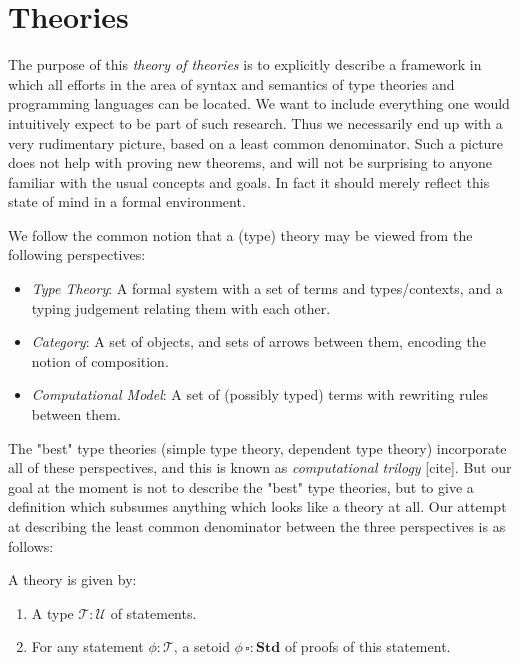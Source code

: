 \documentclass[11pt]{article}
\date{\today}
\title{}
\begin{document}
\tableofcontents

\section{Theories}
\label{sec:org2132292}

The purpose of this \emph{theory of theories} is to explicitly describe a framework in
which all efforts in the area of syntax and semantics of type theories and programming languages
can be located. We want to include everything one would intuitively expect to be part of such research.
Thus we necessarily end up with a very rudimentary picture, based on a least common denominator.
Such a picture does not help with proving new theorems, and will not be surprising to anyone familiar
with the usual concepts and goals. In fact it should merely reflect this state of mind in a formal environment.

We follow the common notion that a (type) theory may be viewed from the following perspectives:
\begin{itemize}
\item \emph{Type Theory}: A formal system with a set of terms and types/contexts, and a typing judgement relating them with each other.
\item \emph{Category}: A set of objects, and sets of arrows between them, encoding the notion of composition.
\item \emph{Computational Model}: A set of (possibly typed) terms with rewriting rules between them.
\end{itemize}

The "best" type theories (simple type theory, dependent type theory) incorporate all of these perspectives,
and this is known as \emph{computational trilogy} [cite]. But our goal at the moment is not to describe the "best" type theories,
but to give a definition which subsumes anything which looks like a theory at all. Our attempt at describing the least common denominator
between the three perspectives is as follows:

\begin{definition}
  A theory is given by:
  \begin{enumerate}
    \item A type $\mathscr{T} : \mathscr{U}$ of statements.
    \item For any statement $\phi : \mathscr{T}$, a setoid $\phi\,\square : \mathbf{Std}$ of proofs of this statement.
  \end{enumerate}
\end{definition}
\end{document}

